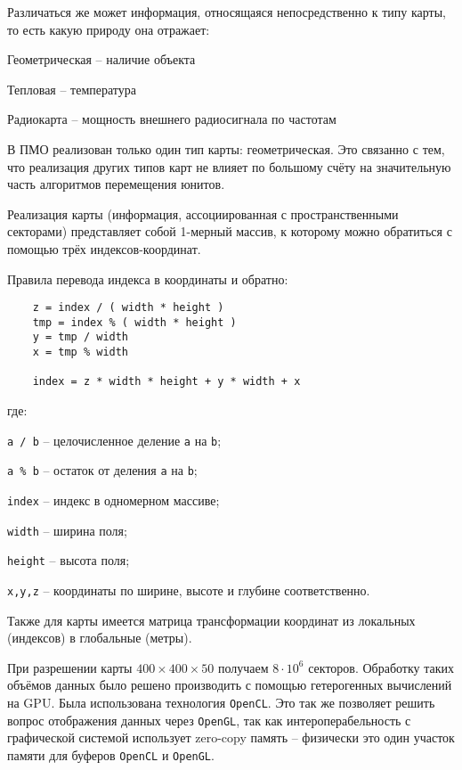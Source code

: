 Различаться же может информация, относящаяся непосредственно к типу 
карты, то есть какую природу она отражает:

\begin{mintemize}

\item Геометрическая -- наличие объекта

\item Тепловая -- температура

\item Радиокарта -- мощность внешнего радиосигнала по частотам

\end{mintemize}

В ПМО реализован только один тип карты: геометрическая. Это связанно с тем, что
реализация других типов карт не влияет по большому счёту на значительную часть
алгоритмов перемещения юнитов.

Реализация карты (информация, ассоциированная с пространственными секторами)
представляет собой 1-мерный массив, к которому можно обратиться с помощью трёх
индексов-координат.

Правила перевода индекса в координаты и обратно:

\begin{verbatim}
    z = index / ( width * height )
    tmp = index % ( width * height )
    y = tmp / width
    x = tmp % width

    index = z * width * height + y * width + x
\end{verbatim}
\vspace{-0.5em}

где:

\verb|a / b| -- целочисленное деление \verb|a| на \verb|b|;

\verb|a % b| -- остаток от деления \verb|a| на \verb|b|;

\verb|index| -- индекс в одномерном массиве;

\verb|width| -- ширина поля;

\verb|height| -- высота поля;

\verb|x,y,z| -- координаты по ширине, высоте и глубине соответственно.

Также для карты имеется матрица трансформации координат из локальных (индексов)
в глобальные (метры).

При разрешении карты $400 \times 400 \times 50$ получаем $8 \cdot 10^6$ секторов.
Обработку таких объёмов данных было решено производить с помощью гетерогенных 
вычислений на GPU. Была использована технология \verb|OpenCL|. Это так же 
позволяет решить вопрос отображения данных через \verb|OpenGL|, так как
интероперабельность с графической системой использует zero-copy память -- 
физически это один участок памяти для буферов \verb|OpenCL| и \verb|OpenGL|.

